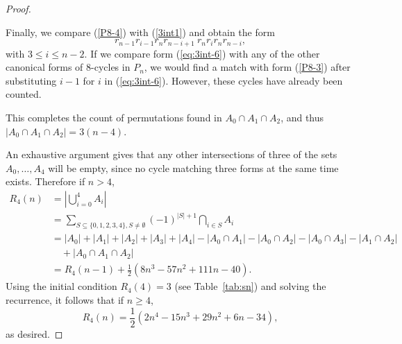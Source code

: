 \documentclass[final]{dmtcs-episciences}
\numberwithin{equation}{section}
\begin{document}
\begin{proof}
\begin{description}
Finally, we compare (\ref{P8-4}) with (\ref{3int1}) and obtain the form
\begin{equation}\label{eq:3int-6}
r_{n-1}r_{i-1}r_{n}r_{n-i+1} \ r_{n}r_{i}r_{n}r_{n-i},
\end{equation} with $3 \leq i \leq n-2$. If we compare form (\ref{eq:3int-6}) with any of the other canonical forms of 8-cycles in $P_n$, we would find a match with form (\ref{P8-3}) after substituting $i-1$ for $i$ in (\ref{eq:3int-6}). However, these cycles have already been counted. 

This completes the count of permutations found in $A_0 \cap A_1 \cap A_2$, and thus $|A_0 \cap A_1 \cap A_2|=3(n-4)$.
\end{description}

An exhaustive argument gives that any other intersections of three of the sets $A_0,\ldots,A_4$ will be empty, since no cycle matching three forms at the same time exists. Therefore if $n>4$,
\begin{align*}
    R_4(n) &= \left|\bigcup_{i=0}^4 A_i\right| \\
    &= \sum_{S \subseteq \{0,1,2,3,4\}, S \neq \emptyset} (-1)^{|S|+1} \bigcap_{i \in S} A_i\\ 
          &= |A_0| + |A_1| + |A_2| + |A_3| + |A_4| - |A_0 \cap A_1| -
            |A_0 \cap A_2| - |A_0 \cap A_3| - |A_1 \cap A_2|\\
            & \quad + |A_0 \cap A_1 \cap A_2|\\
            &=R_4(n-1) + \frac{1}{2}(8n^3 - 57n^2 + 111n - 40).
\end{align*} Using the initial condition $R_4(4)=3$ (see Table~\ref{tab:sn}) and solving the recurrence, it follows that if $n\geq4$,
\[
R_4(n)=\frac{1}{2} (2 n^4 - 15 n^3 + 29 n^2 + 6 n - 34),
\] as desired. 
\end{proof}


\end{document}
